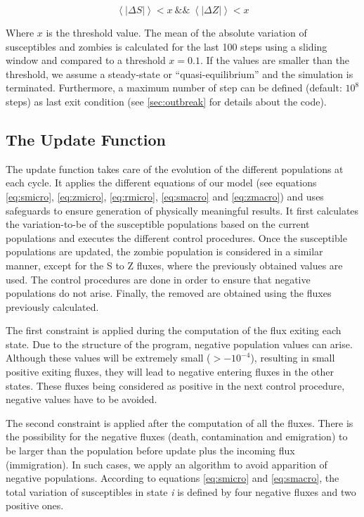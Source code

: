 \documentclass[11pt]{article} %
\begin{document}
\bigskip
\begin{equation} \label{eq:outbreakequilibrium}
\left\langle \left| \Delta S \right| \right\rangle < x\ \&\&\ \left\langle\left|\Delta Z \right| \right\rangle < x
\end{equation}
\bigskip

Where $x$ is the threshold value. The mean of the absolute variation of susceptibles and zombies is calculated for the last 100 steps using a sliding window and compared to a threshold $x = 0.1$. If the values are smaller than the threshold, we assume a steady-state or ``quasi-equilibrium'' and the simulation is terminated. Furthermore, a maximum number of step can be defined (default: $10^8$ steps) as last exit condition (see \ref{sec:outbreak} for details about the code).

\subsection{The Update Function}\indent

The update function takes care of the evolution of the different populations at each cycle. It applies the different equations of our model (see equations \eqref{eq:smicro}, \eqref{eq:zmicro}, \eqref{eq:rmicro}, \eqref{eq:smacro} and \eqref{eq:zmacro}) and uses safeguards to ensure generation of physically meaningful results. It first calculates the variation-to-be of the susceptible populations based on the current populations and executes the different control procedures. Once the susceptible populations are updated, the zombie population is considered in a similar manner, except for the S to Z fluxes, where the previously obtained values are used. The control procedures are done in order to ensure that negative populations do not arise. Finally, the removed are obtained using the fluxes previously calculated.

The first constraint is applied during the computation of the flux exiting each state. Due to the structure of the program, negative population values can arise. Although these values will be extremely small ($> - 10^{-4}$), resulting in small positive exiting fluxes, they will lead to negative entering fluxes in the other states. These fluxes being considered as positive in the next control procedure, negative values have to be avoided.

The second constraint is applied after the computation of all the fluxes. There is the possibility for the negative fluxes (death, contamination and emigration) to be larger than the population before update plus the incoming flux (immigration). In such cases, we apply an algorithm to avoid apparition of negative populations. According to equations \eqref{eq:smicro} and \eqref{eq:smacro}, the total variation of susceptibles in state \textit{i} is defined by four negative fluxes and two positive ones.
\end{document}
